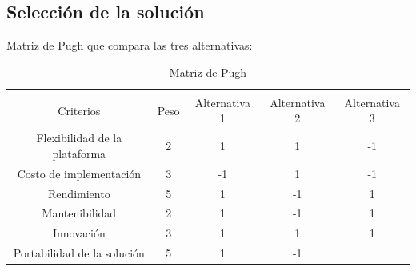 \documentclass[12pt]{article}
\begin{document}
\subsection{Selección de la solución}

Matriz de Pugh que compara las tres alternativas:

\begin{table}[h!]
  \caption{Matriz de Pugh}{
  \label{tab:matriz_de_pugh}
  \begin{tabular}{ccccc}
  \hline
  \multicolumn{1}{|c|}{\cellcolor[HTML]{93C47D}} &
    \multicolumn{1}{c|}{\cellcolor[HTML]{93C47D}} &
    \multicolumn{1}{c|}{\cellcolor[HTML]{93C47D}} &
    \multicolumn{1}{c|}{\cellcolor[HTML]{93C47D}} &
    \multicolumn{1}{c|}{\cellcolor[HTML]{93C47D}} \\
  \multicolumn{1}{|c|}{\multirow{-2}{*}{\cellcolor[HTML]{93C47D} Criterios}} &
    \multicolumn{1}{c|}{\multirow{-2}{*}{\cellcolor[HTML]{93C47D} Peso}} &
    \multicolumn{1}{c|}{\multirow{-2}{*}{\cellcolor[HTML]{93C47D} Alternativa 1}} &
    \multicolumn{1}{c|}{\multirow{-2}{*}{\cellcolor[HTML]{93C47D} Alternativa 2}} &
    \multicolumn{1}{c|}{\multirow{-2}{*}{\cellcolor[HTML]{93C47D} Alternativa 3}} \\ \hline
  \multicolumn{1}{|c|}{\cellcolor[HTML]{93C47D} Flexibilidad de la plataforma} &
    \multicolumn{1}{c|}{2} &
    \multicolumn{1}{c|}{1} &
    \multicolumn{1}{c|}{1} &
    \multicolumn{1}{c|}{-1} \\ \hline
  \multicolumn{1}{|c|}{\cellcolor[HTML]{93C47D} Costo de implementación} &
    \multicolumn{1}{c|}{3} &
    \multicolumn{1}{c|}{-1} &
    \multicolumn{1}{c|}{1} &
    \multicolumn{1}{c|}{-1} \\ \hline
  \multicolumn{1}{|c|}{\cellcolor[HTML]{93C47D} Rendimiento} &
    \multicolumn{1}{c|}{5} &
    \multicolumn{1}{c|}{1} &
    \multicolumn{1}{c|}{-1} &
    \multicolumn{1}{c|}{1} \\ \hline
  \multicolumn{1}{|c|}{\cellcolor[HTML]{93C47D} Mantenibilidad} &
    \multicolumn{1}{c|}{2} &
    \multicolumn{1}{c|}{1} &
    \multicolumn{1}{c|}{-1} &
    \multicolumn{1}{c|}{1} \\ \hline
  \multicolumn{1}{|c|}{\cellcolor[HTML]{93C47D} Innovación} &
    \multicolumn{1}{c|}{3} &
    \multicolumn{1}{c|}{1} &
    \multicolumn{1}{c|}{1} &
    \multicolumn{1}{c|}{1} \\ \hline
  \multicolumn{1}{|c|}{\cellcolor[HTML]{93C47D} Portabilidad de la solución} &
    \multicolumn{1}{c|}{5} &
    \multicolumn{1}{c|}{1} &
    \multicolumn{1}{c|}{-1} &

\end{tabular}}
\end{table}
\end{document}
